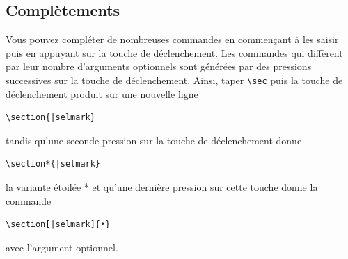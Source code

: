 \documentclass[11pt,french]{article}
\newcommand{\cmd}[1]{\textsf{#1}}
\newcommand{\mnu}[1]{\textsf{#1}}
\newcommand{\To}{\,\(\to\)\,}
\begin{document}

\subsection{Complètements}

Vous pouvez compléter de nombreuses commandes en commençant à les saisir puis en appuyant sur la touche de déclenchement. Les commandes qui diffèrent par leur nombre d'arguments optionnels sont générées par des pressions successives sur la touche de déclenchement. Ainsi, taper \verb|\sec| puis la touche de déclenchement produit sur une nouvelle ligne

\begin{verbatim}
\section{|selmark}
\end{verbatim}
tandis qu'une seconde pression sur la touche de déclenchement donne
\begin{verbatim}
\section*{|selmark}
\end{verbatim}
la variante étoilée * et qu'une dernière pression sur cette touche donne la commande
\begin{verbatim}
\section[|selmark]{•}
\end{verbatim}
avec l'argument optionnel.
\end{document}
